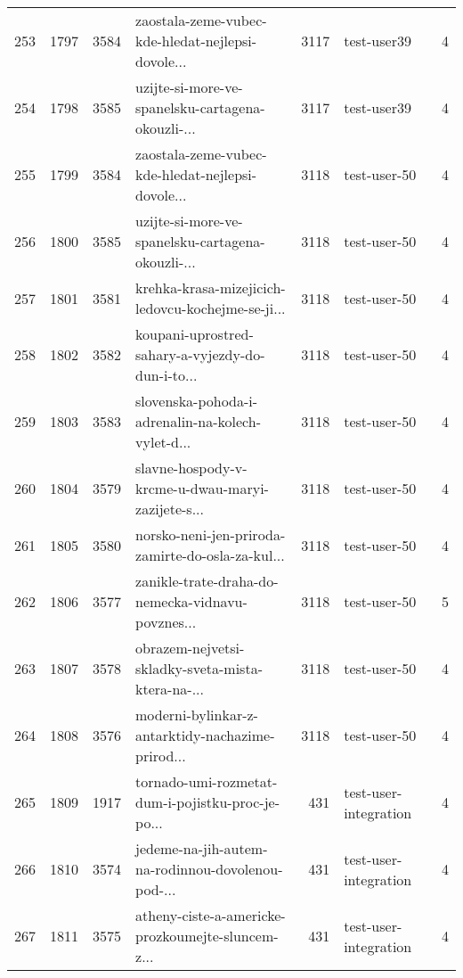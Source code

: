 \begin{tabular}{lrrlrlr}
253  &       1797 &     3584 &  zaostala-zeme-vubec-kde-hledat-nejlepsi-dovole... &     3117 &                  test-user39 &               4 \\
254  &       1798 &     3585 &  uzijte-si-more-ve-spanelsku-cartagena-okouzli-... &     3117 &                  test-user39 &               4 \\
255  &       1799 &     3584 &  zaostala-zeme-vubec-kde-hledat-nejlepsi-dovole... &     3118 &                 test-user-50 &               4 \\
256  &       1800 &     3585 &  uzijte-si-more-ve-spanelsku-cartagena-okouzli-... &     3118 &                 test-user-50 &               4 \\
257  &       1801 &     3581 &  krehka-krasa-mizejicich-ledovcu-kochejme-se-ji... &     3118 &                 test-user-50 &               4 \\
258  &       1802 &     3582 &  koupani-uprostred-sahary-a-vyjezdy-do-dun-i-to... &     3118 &                 test-user-50 &               4 \\
259  &       1803 &     3583 &  slovenska-pohoda-i-adrenalin-na-kolech-vylet-d... &     3118 &                 test-user-50 &               4 \\
260  &       1804 &     3579 &  slavne-hospody-v-krcme-u-dwau-maryi-zazijete-s... &     3118 &                 test-user-50 &               4 \\
261  &       1805 &     3580 &  norsko-neni-jen-priroda-zamirte-do-osla-za-kul... &     3118 &                 test-user-50 &               4 \\
262  &       1806 &     3577 &  zanikle-trate-draha-do-nemecka-vidnavu-povznes... &     3118 &                 test-user-50 &               5 \\
263  &       1807 &     3578 &  obrazem-nejvetsi-skladky-sveta-mista-ktera-na-... &     3118 &                 test-user-50 &               4 \\
264  &       1808 &     3576 &  moderni-bylinkar-z-antarktidy-nachazime-prirod... &     3118 &                 test-user-50 &               4 \\
265  &       1809 &     1917 &  tornado-umi-rozmetat-dum-i-pojistku-proc-je-po... &      431 &        test-user-integration &               4 \\
266  &       1810 &     3574 &  jedeme-na-jih-autem-na-rodinnou-dovolenou-pod-... &      431 &        test-user-integration &               4 \\
267  &       1811 &     3575 &  atheny-ciste-a-americke-prozkoumejte-sluncem-z... &      431 &        test-user-integration &               4 \\

\end{tabular}
